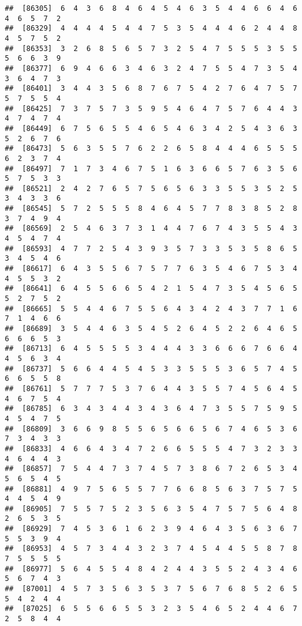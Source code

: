 \documentclass[
]{book}
\begin{document}
\begin{verbatim}
##  [86305]  6  4  3  6  8  4  6  4  5  4  6  3  5  4  4  6  6  4  6  4  6  5  7  2
##  [86329]  4  4  4  4  5  4  4  7  5  3  5  4  4  4  6  2  4  4  8  4  5  7  5  2
##  [86353]  3  2  6  8  5  6  5  7  3  2  5  4  7  5  5  5  3  5  5  5  6  6  3  9
##  [86377]  6  9  4  6  6  3  4  6  3  2  4  7  5  5  4  7  3  5  4  3  6  4  7  3
##  [86401]  3  4  4  3  5  6  8  7  6  7  5  4  2  7  6  4  7  5  7  5  7  5  5  4
##  [86425]  7  3  7  5  7  3  5  9  5  4  6  4  7  5  7  6  4  4  3  4  7  4  7  4
##  [86449]  6  7  5  6  5  5  4  6  5  4  6  3  4  2  5  4  3  6  3  5  2  6  7  6
##  [86473]  5  6  3  5  5  7  6  2  2  6  5  8  4  4  4  6  5  5  5  6  2  3  7  4
##  [86497]  7  1  7  3  4  6  7  5  1  6  3  6  6  5  7  6  3  5  6  5  7  5  3  3
##  [86521]  2  4  2  7  6  5  7  5  6  5  6  3  3  5  5  3  5  2  5  3  4  3  3  6
##  [86545]  5  7  2  5  5  5  8  4  6  4  5  7  7  8  3  8  5  2  8  3  7  4  9  4
##  [86569]  2  5  4  6  3  7  3  1  4  4  7  6  7  4  3  5  5  4  3  4  5  4  7  4
##  [86593]  4  7  7  2  5  4  3  9  3  5  7  3  3  5  3  5  8  6  5  3  4  5  4  6
##  [86617]  6  4  3  5  5  6  7  5  7  7  6  3  5  4  6  7  5  3  4  4  5  5  3  2
##  [86641]  6  4  5  5  6  6  5  4  2  1  5  4  7  3  5  4  5  6  5  5  2  7  5  2
##  [86665]  5  5  4  4  6  7  5  5  6  4  3  4  2  4  3  7  7  1  6  7  1  4  6  6
##  [86689]  3  5  4  4  6  3  5  4  5  2  6  4  5  2  2  6  4  6  5  6  6  6  5  3
##  [86713]  6  4  5  5  5  5  3  4  4  4  3  3  6  6  6  7  6  6  4  4  5  6  3  4
##  [86737]  5  6  6  4  4  5  4  5  3  3  5  5  5  3  6  5  7  4  5  6  6  5  5  8
##  [86761]  5  7  7  7  5  3  7  6  4  4  3  5  5  7  4  5  6  4  5  4  6  7  5  4
##  [86785]  6  3  4  3  4  4  3  4  3  6  4  7  3  5  5  7  5  9  5  4  5  4  7  5
##  [86809]  3  6  6  9  8  5  5  6  5  6  6  5  6  7  4  6  5  3  6  7  3  4  3  3
##  [86833]  4  6  6  4  3  4  7  2  6  6  5  5  5  4  7  3  2  3  3  4  6  4  4  3
##  [86857]  7  5  4  4  7  3  7  4  5  7  3  8  6  7  2  6  5  3  4  5  6  5  4  5
##  [86881]  4  9  7  5  6  5  5  7  7  6  6  8  5  6  3  7  5  7  5  4  4  5  4  9
##  [86905]  7  5  5  7  5  2  3  5  6  3  5  4  7  5  7  5  6  4  8  2  6  5  3  5
##  [86929]  7  4  5  3  6  1  6  2  3  9  4  6  4  3  5  6  3  6  7  5  5  3  9  4
##  [86953]  4  5  7  3  4  4  3  2  3  7  4  5  4  4  5  5  8  7  8  7  5  5  5  5
##  [86977]  5  6  4  5  5  4  8  4  2  4  4  3  5  5  2  4  3  4  6  5  6  7  4  3
##  [87001]  4  5  7  3  5  6  3  5  3  7  5  6  7  6  8  5  2  6  5  5  4  2  4  4
##  [87025]  6  5  5  6  6  5  5  3  2  3  5  4  6  5  2  4  4  6  7  2  5  8  4  4

\end{verbatim}
\end{document}
